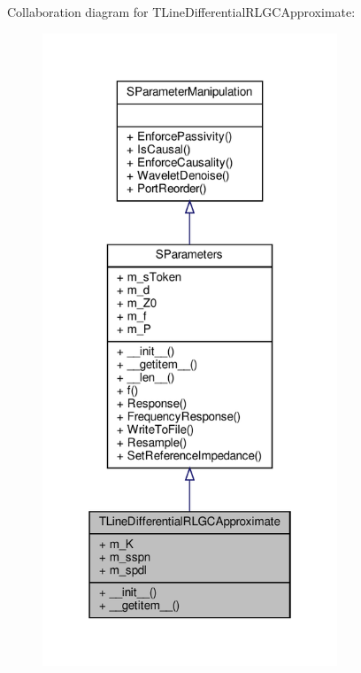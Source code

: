 Collaboration diagram for T\+Line\+Differential\+R\+L\+G\+C\+Approximate\+:\nopagebreak
\begin{figure}[H]
\begin{center}
\leavevmode
\includegraphics[width=250pt]{classSignalIntegrity_1_1SParameters_1_1Devices_1_1TLineDifferentialRLGCApproximate_1_1TLineDiffe3751d0890de559d29b829445e1292a00}
\end{center}
\end{figure}
